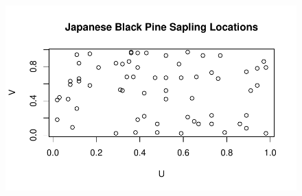 \documentclass[
  letterpaper,
  DIV=11,
  numbers=noendperiod]{scrartcl}
\begin{document}
\begin{figure}[H]

{\centering \includegraphics{robby_homework_2_files/figure-pdf/unnamed-chunk-1-1.pdf}

}

\end{figure}
\end{document}
